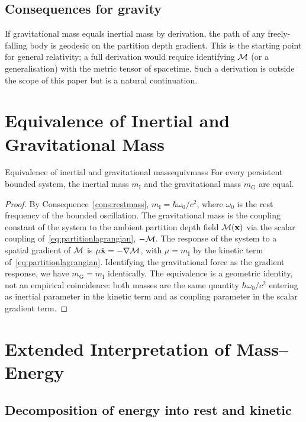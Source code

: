 \subsection{Consequences for gravity}

If gravitational mass equals inertial mass by derivation, the path of any freely-falling body is geodesic on the partition depth gradient. This is the starting point for general relativity; a full derivation would require identifying $\mathcal{M}$ (or a generalisation) with the metric tensor of spacetime. Such a derivation is outside the scope of this paper but is a natural continuation.

\section{Equivalence of Inertial and Gravitational Mass}
\label{sec:equivmass}

\begin{consequence}{Equivalence of inertial and gravitational mass}{equivmass}
For every persistent bounded system, the inertial mass $m_{\mathrm{I}}$ and the gravitational mass $m_{\mathrm{G}}$ are equal.
\end{consequence}

\begin{proof}
By Consequence~\ref{cons:restmass}, $m_{\mathrm{I}}=\hbar\omega_{0}/c^{2}$, where $\omega_{0}$ is the rest frequency of the bounded oscillation. The gravitational mass is the coupling constant of the system to the ambient partition depth field $\mathcal{M}(\mathbf{x})$ via the scalar coupling of~\eqref{eq:partitionlagrangian}, $-\mathcal{M}$. The response of the system to a spatial gradient of $\mathcal{M}$ is $\mu\ddot{\mathbf{x}}=-\nabla\mathcal{M}$, with $\mu=m_{\mathrm{I}}$ by the kinetic term of~\eqref{eq:partitionlagrangian}. Identifying the gravitational force as the gradient response, we have $m_{\mathrm{G}}=m_{\mathrm{I}}$ identically. The equivalence is a geometric identity, not an empirical coincidence: both masses are the same quantity $\hbar\omega_{0}/c^{2}$ entering as inertial parameter in the kinetic term and as coupling parameter in the scalar gradient term.
\end{proof}

\section{Extended Interpretation of Mass--Energy}
\label{sec:extendedEmc2}

\subsection{Decomposition of energy into rest and kinetic}

